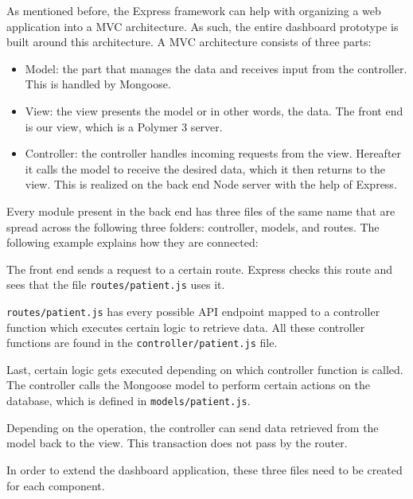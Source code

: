         As mentioned before, the Express framework can help with organizing a web application into a MVC architecture. As such, the entire dashboard prototype is built around this architecture. A MVC architecture consists of three parts:
        \begin{itemize}
            \item Model: the part that manages the data and receives input from the controller. This is handled by Mongoose.
            \item View: the view presents the model or in other words, the data. The front end is our view, which is a Polymer 3 server.
            \item Controller: the controller handles incoming requests from the view. Hereafter it calls the model to receive the desired data, which it then returns to the view. This is realized on the back end Node server with the help of Express.
        \end{itemize}

        \noindent Every module present in the back end has three files of the same name that are spread across the following three folders: controller, models, and routes. The following example explains how they are connected:
        \begin{myenumerate}
            \item The front end sends a request to a certain route. Express checks this route and sees that the file \texttt{routes/patient.js} uses it. 
            \item \texttt{routes/patient.js} has every possible API endpoint mapped to a controller function which executes certain logic to retrieve data. All these controller functions are found in the \texttt{controller/patient.js} file.
            \item Last, certain logic gets executed depending on which controller function is called. The controller calls the Mongoose model to perform certain actions on the database, which is defined in \texttt{models/patient.js}.
            \item Depending on the operation, the controller can send data retrieved from the model back to the view. This transaction does not pass by the router.
        \end{myenumerate}

        \noindent In order to extend the dashboard application, these three files need to be created for each component.

